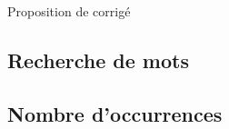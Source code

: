 
\vspace{0.1cm}
\begin{huge}
 Proposition de corrigé
\end{huge}

\subsection{Recherche de mots}
\setcounter{thequestion}{0}
\subsection{Nombre d'occurrences}
\setcounter{thequestion}{0}

